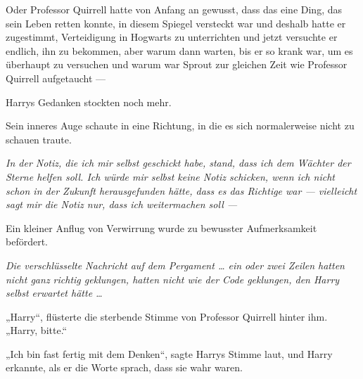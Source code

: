 Oder Professor Quirrell hatte von Anfang an gewusst, dass das eine Ding, das sein Leben retten konnte, in diesem Spiegel versteckt war und deshalb hatte er zugestimmt, Verteidigung in Hogwarts zu unterrichten und jetzt versuchte er endlich, ihn zu bekommen, aber warum dann warten, bis er so krank war, um es überhaupt zu versuchen und warum war Sprout zur gleichen Zeit wie Professor Quirrell aufgetaucht —

Harrys Gedanken stockten noch mehr.

Sein inneres Auge schaute in eine Richtung, in die es sich normalerweise nicht zu schauen traute.

\emph{In der Notiz, die ich mir selbst geschickt habe, stand, dass ich dem Wächter der Sterne helfen soll. Ich würde mir selbst keine Notiz schicken, wenn ich nicht schon in der Zukunft herausgefunden hätte, dass es das Richtige war — vielleicht sagt mir die Notiz nur, dass ich weitermachen soll —}

Ein kleiner Anflug von Verwirrung wurde zu bewusster Aufmerksamkeit befördert.

\emph{Die verschlüsselte Nachricht auf dem Pergament … ein oder zwei Zeilen hatten nicht ganz richtig geklungen, hatten nicht wie der Code geklungen, den Harry selbst erwartet hätte …}

„Harry“, flüsterte die sterbende Stimme von Professor Quirrell hinter ihm.
„Harry, bitte.“

„Ich bin fast fertig mit dem Denken“, sagte Harrys Stimme laut, und Harry erkannte, als er die Worte sprach, dass sie wahr waren.

